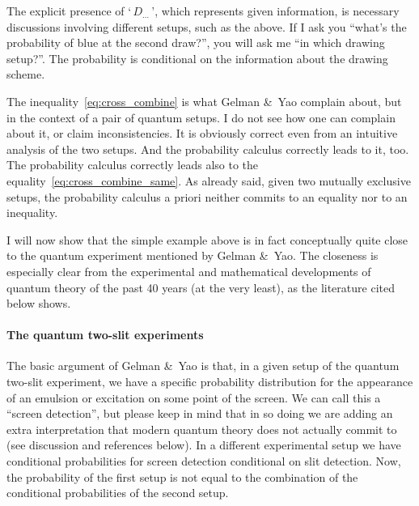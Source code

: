 \documentclass[\ifafour a4paper,12pt,\else a5paper,10pt,\fi%
onecolumn,oneside,article,%
british%
]{memoir}
\newcommand*{\defquote}[1]{`\,#1\,'}
\theoremstyle{remark}
\theoremstyle{innote}
\newcommand*{\citey}{\parencites*}
\newcommand*{\amp}{\&}
\renewcommand*{\|}[1][]{\nonscript\,#1\vert\nonscript\;\mathopen{}}
\begin{document}

The explicit presence of \defquote{$D_{\dotso}$}, which represents given
information, is necessary discussions involving different setups, such as
the above. If I ask you \enquote{what's the probability of blue at the
  second draw?}, you will ask me \enquote{in which drawing setup?}. The
probability is conditional on the information about the drawing scheme.


\medskip

The inequality~\eqref{eq:cross_combine} is what Gelman \amp\ Yao
\citey[p.~2]{gelmanetal2020} complain about, but in the context of a pair
of quantum setups. I do not see how one can complain about it, or claim
inconsistencies. It is obviously correct even from an intuitive analysis of
the two setups. And the probability calculus correctly leads to it, too.
The probability calculus correctly leads also to the
equality~\eqref{eq:cross_combine_same}. As already said, given two mutually
exclusive setups, the probability calculus a priori neither commits to an
equality nor to an inequality.


I will now show that the simple example above is in fact conceptually quite
close to the quantum experiment mentioned by Gelman \amp\ Yao. The
closeness is especially clear from the experimental and mathematical
developments of quantum theory of the past 40 years (at the very least), as
the literature cited below shows.

\bigskip

\paragraph{The quantum two-slit experiments}

The basic argument of Gelman \amp\ Yao is that, in a given setup of the
quantum two-slit experiment, we have a specific probability distribution
for the appearance of an emulsion or excitation on some point of the
screen. We can call this a \enquote{screen detection}, but please keep in
mind that in so doing we are adding an extra interpretation that modern
quantum theory does not actually commit to (see discussion and references
below). In a different experimental setup we have conditional probabilities
for screen detection conditional on slit detection. Now, the probability of
the first setup is not equal to the combination of the conditional
probabilities of the second setup.
\end{document}
